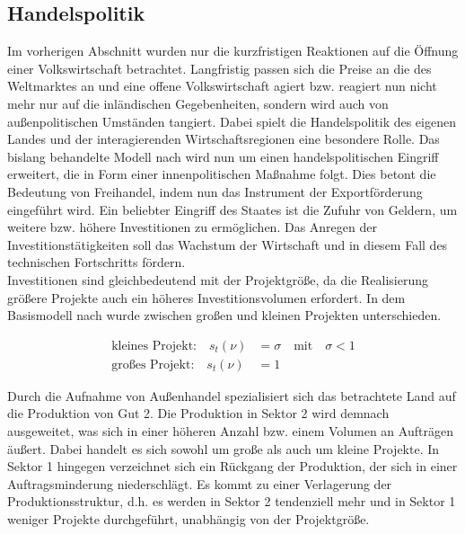 \subsection{Handelspolitik}\label{sec:Handelspolitik}
Im vorherigen Abschnitt wurden nur die kurzfristigen Reaktionen auf die Öffnung einer Volkswirtschaft betrachtet. Langfristig passen sich die Preise an die des Weltmarktes an und eine offene Volkswirtschaft agiert bzw. reagiert nun nicht mehr nur auf die inländischen Gegebenheiten, sondern wird auch von außenpolitischen Umständen tangiert. Dabei spielt die Handelspolitik des eigenen Landes und der interagierenden Wirtschaftsregionen eine besondere Rolle. Das bislang behandelte Modell nach \cite{Acemoglu.2006} wird nun um einen handelspolitischen Eingriff erweitert, die in Form einer innenpolitischen Maßnahme folgt. Dies betont die Bedeutung von Freihandel, indem nun das Instrument der Exportförderung eingeführt wird. Ein beliebter Eingriff des Staates ist die Zufuhr von Geldern, um weitere bzw. höhere Investitionen zu ermöglichen. Das Anregen der Investitionstätigkeiten soll das Wachstum der Wirtschaft und in diesem Fall des technischen Fortschritts fördern.\\
Investitionen sind gleichbedeutend mit der Projektgröße, da die Realisierung größere Projekte auch ein höheres Investitionsvolumen erfordert. In dem Basismodell nach \cite{Acemoglu.2006} wurde zwischen großen und kleinen Projekten unterschieden. 


	\begin{align*}
		\text{kleines Projekt:}\quad s_t(\nu) &= \sigma\quad \text{mit}\quad\sigma < 1 \\
		\text{großes Projekt:}\quad s_t(\nu) &= 1
	\end{align*}


Durch die Aufnahme von Außenhandel spezialisiert sich das betrachtete Land auf die Produktion von Gut 2. Die Produktion in Sektor 2 wird demnach ausgeweitet, was sich in einer höheren Anzahl bzw. einem Volumen an Aufträgen äußert. Dabei handelt es sich sowohl um große als auch um kleine Projekte. In Sektor 1 hingegen verzeichnet sich ein Rückgang der Produktion, der sich in einer Auftragsminderung niederschlägt. Es kommt zu einer Verlagerung der Produktionsstruktur, d.h. es werden in Sektor 2 tendenziell mehr und in Sektor 1 weniger Projekte durchgeführt, unabhängig von der Projektgröße.\\


